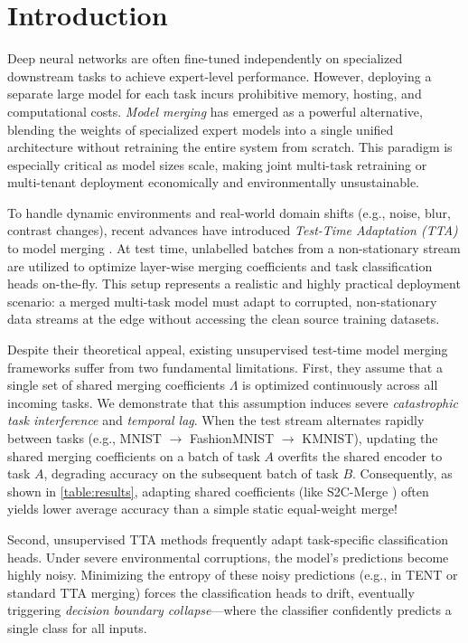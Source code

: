 \documentclass{article}
\theoremstyle{plain}
\theoremstyle{definition}
\theoremstyle{remark}
\begin{document}
\section{Introduction}
\label{sec:intro}
Deep neural networks are often fine-tuned independently on specialized downstream tasks to achieve expert-level performance. However, deploying a separate large model for each task incurs prohibitive memory, hosting, and computational costs. \emph{Model merging} \cite{modelsoups2022, taskarithmetic2022} has emerged as a powerful alternative, blending the weights of specialized expert models into a single unified architecture without retraining the entire system from scratch. This paradigm is especially critical as model sizes scale, making joint multi-task retraining or multi-tenant deployment economically and environmentally unsustainable.

To handle dynamic environments and real-world domain shifts (e.g., noise, blur, contrast changes), recent advances have introduced \emph{Test-Time Adaptation (TTA)} to model merging \cite{sata2026, s2cmerge2026, ewctta2026}. At test time, unlabelled batches from a non-stationary stream are utilized to optimize layer-wise merging coefficients and task classification heads on-the-fly. This setup represents a realistic and highly practical deployment scenario: a merged multi-task model must adapt to corrupted, non-stationary data streams at the edge without accessing the clean source training datasets.

Despite their theoretical appeal, existing unsupervised test-time model merging frameworks suffer from two fundamental limitations. First, they assume that a single set of shared merging coefficients $\Lambda$ is optimized continuously across all incoming tasks. We demonstrate that this assumption induces severe \emph{catastrophic task interference} and \emph{temporal lag}. When the test stream alternates rapidly between tasks (e.g., MNIST $\to$ FashionMNIST $\to$ KMNIST), updating the shared merging coefficients on a batch of task $A$ overfits the shared encoder to task $A$, degrading accuracy on the subsequent batch of task $B$. Consequently, as shown in \cref{table:results}, adapting shared coefficients (like S2C-Merge \cite{s2cmerge2026}) often yields lower average accuracy than a simple static equal-weight merge!

Second, unsupervised TTA methods frequently adapt task-specific classification heads. Under severe environmental corruptions, the model's predictions become highly noisy. Minimizing the entropy of these noisy predictions (e.g., in TENT \cite{tent2021} or standard TTA merging) forces the classification heads to drift, eventually triggering \emph{decision boundary collapse}—where the classifier confidently predicts a single class for all inputs.
\end{document}
